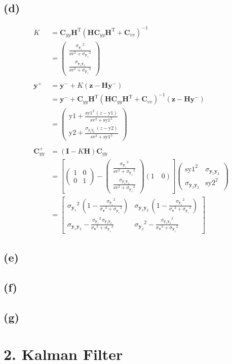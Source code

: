 \documentclass[fleqn, letterpaper]{tufte-handout}
\newcommand{\T}{^\text{T}}
\newcommand{\y}{\mathbf{y}}
\newcommand{\z}{\mathbf{z}}
\newcommand{\I}{\mathbf{I}}
\newcommand{\HH}{\mathbf{H}}
\newcommand{\vecv}{\mathbf{v}}
\newcommand{\cyy}{\mathbf{C}_{yy}}
\newcommand{\cvv}{\mathbf{C}_{vv}}
\newcommand{\KK}{\left(\begin{array}{c} \frac{{\sigma_{\y_1}}^2}{{\mathrm{sv}}^2 + {\sigma_{\y_1}}^2}\\ \frac{\sigma_{\y_1\y_2}}{{\mathrm{sv}}^2 + {\sigma_{\y_1}}^2} \end{array}\right)}
\newcommand{\cyylong}{\left(\begin{array}{cc} {\mathrm{sy1}}^2 & \sigma_{\y_1\y_2}\\ \sigma_{\y_1\y_2} & {\mathrm{sy2}}^2 \end{array}\right)}
\begin{document}
\subsection{(d)}
\begin{align*}
K &= \cyy \HH\T(\HH\cyy\HH\T+\cvv)^{-1} \\
&= \KK\\ \\
\y^+ &= \y^- + K(\z-\HH\y^-) \\
&= \y^- + \cyy \HH\T(\HH\cyy\HH\T+\cvv)^{-1}(\z-\HH\y^-) \\ 
&= \left(\begin{array}{c} \mathrm{y1} + \frac{{\mathrm{sy1}}^2\, \left(z - \mathrm{y1}\right)}{{\mathrm{sv}}^2 + {\mathrm{sy1}}^2}\\ \mathrm{y2} + \frac{\sigma_{y_1y_2}\, \left(z - \mathrm{y2}\right)}{{\mathrm{sv}}^2 + {\mathrm{sy1}}^2} \end{array}\right)\\ \\
\cyy^+  &= \left(\I - K\HH\right)\cyy\\
&= \left[\left(\begin{array}{cc} 1 & 0\\ 0 & 1 \end{array}\right) - \KK (1\quad 0)\right]\cyylong\\
&= \left[\begin{array}{cc}
 {\sigma_{\y_1}}^2\, \left(1 -\frac{{\sigma_{\y_1}}^2}{{\sigma_\vecv}^2 + {\sigma_{\y_1}}^2}\right) 
 &  \sigma_{\y_1\y_2}\, \left(1-\frac{{\sigma_{\y_1}}^2}{{\sigma_\vecv}^2 + {\sigma_{\y_1}}^2}\right)\\
  \sigma_{\y_1\y_2} - \frac{{\sigma_{\y_1}}^2\, \sigma_{\y_1\y_2}}{{\sigma_\vecv}^2 + {\sigma_{\y_1}}^2} 
  & {\sigma_{\y_2}}^2 - \frac{{\sigma_{\y_1\y_2}}^2}{{\sigma_\vecv}^2 + {\sigma_{\y_1}}^2} \end{array}\right]
\end{align*}
\subsection{(e)}
\subsection{(f)}
\subsection{(g)}
\section{2. Kalman Filter}
\end{document}
